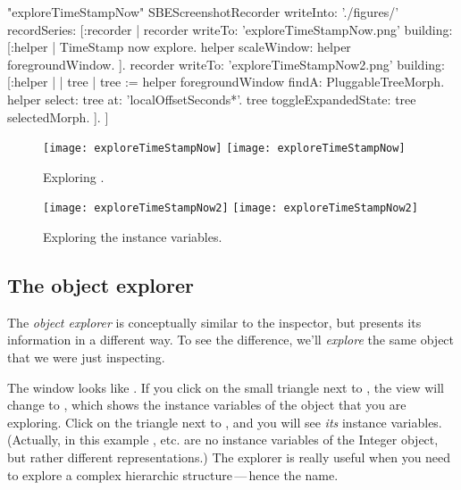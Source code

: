 \documentclass[a4paper,10pt,twoside]{book}
\begin{document}
\begin{ExecuteSmalltalkScript}"exploreTimeStampNow"
SBEScreenshotRecorder writeInto: './figures/' recordSeries: [:recorder |
	recorder writeTo: 'exploreTimeStampNow.png' building: [:helper |
		TimeStamp now explore.
		helper scaleWindow: helper foregroundWindow.
	].
	recorder writeTo: 'exploreTimeStampNow2.png' building: [:helper |
		| tree |
		tree := helper foregroundWindow findA: PluggableTreeMorph.
		helper
			select: tree
			at: 'localOffsetSeconds*'.
		tree toggleExpandedState: tree selectedMorph.
	].
]
\end{ExecuteSmalltalkScript}
\begin{figure}[tbp]
\begin{minipage}[t]{0.48\textwidth}
	\begin{center}
	\ifluluelse
		{\texttt{[image: exploreTimeStampNow]}}
		{\texttt{[image: exploreTimeStampNow]}}
	\end{center}
	\caption{Exploring .}
	\label{fig:exploreTimeStampNow}
\end{minipage}
\hfill
\begin{minipage}[t]{0.48\textwidth}
	\begin{center}
	\ifluluelse
		{\texttt{[image: exploreTimeStampNow2]}}
		{\texttt{[image: exploreTimeStampNow2]}}
	\end{center}
	\caption{Exploring the instance variables.}
	\label{fig:exploreTimeStampNow2}
\end{minipage}
\end{figure}

\subsection{The object explorer}

The \emph{object explorer} is conceptually similar to the inspector, but presents its information in a different way.
To see the difference, we'll \emph{explore} the same object that we were just inspecting.

The  window looks like .
If you click on the small triangle next to , the view will change to , which shows the instance variables of the object that you are exploring.
Click on the triangle next to , and you will see \emph{its} instance variables. (Actually, in this example ,  etc. are no instance variables of the Integer object, but rather different representations.)
The explorer is really useful when you need to explore a complex hierarchic structure\,---\,hence the name.
\end{document}

